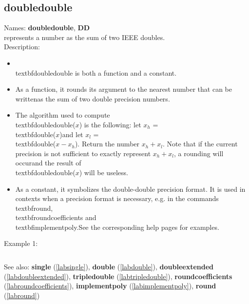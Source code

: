 \subsection{doubledouble}
\label{labdoubledouble}
\noindent Names: \textbf{doubledouble}, \textbf{DD}\\
represents a number as the sum of two IEEE doubles.\\
\noindent Description: \begin{itemize}

\item \\textbf{doubledouble} is both a function and a constant.\n
\item As a function, it rounds its argument to the nearest number that can be written\n   as the sum of two double precision numbers.\n
\item The algorithm used to compute \\textbf{doubledouble}($x$) is the following: let $x_h$ = \\textbf{double}($x$)\n   and let $x_l$ = \\textbf{double}($x-x_h$). Return the number $x_h+x_l$. Note that if the current \n   precision is not sufficient to exactly represent $x_h + x_l$, a rounding will occur\n   and the result of \\textbf{doubledouble}($x$) will be useless.\n
\item As a constant, it symbolizes the double-double precision format. It is used in \n   contexts when a precision format is necessary, e.g. in the commands \n   \\textbf{round}, \\textbf{roundcoefficients} and \\textbf{implementpoly}.\n   See the corresponding help pages for examples.\n\end{itemize}
\noindent Example 1: 
\begin{center}\begin{minipage}{15cm}\begin{Verbatim}[frame=single]
\end{Verbatim}
\end{minipage}\end{center}
See also: \textbf{single} (\ref{labsingle}), \textbf{double} (\ref{labdouble}), \textbf{doubleextended} (\ref{labdoubleextended}), \textbf{tripledouble} (\ref{labtripledouble}), \textbf{roundcoefficients} (\ref{labroundcoefficients}), \textbf{implementpoly} (\ref{labimplementpoly}), \textbf{round} (\ref{labround})
